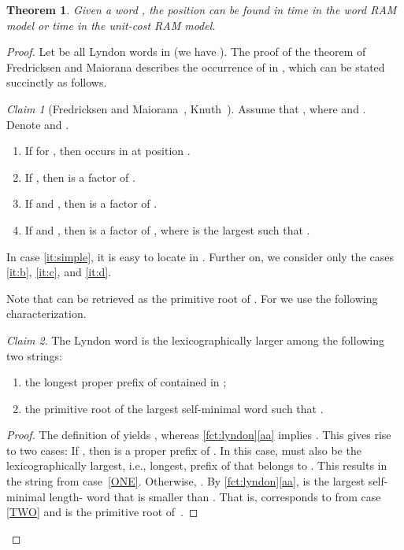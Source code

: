 \documentclass{article}
\newtheorem{theorem}{Theorem}
\theoremstyle{definition}
\theoremstyle{remark}
\newtheorem*{claim}{Claim}
\begin{document}
\begin{theorem}\label{thm:decoding}
  Given a word , the position  can be found in  time in the word RAM model or  time in the unit-cost RAM model.
\end{theorem}
\begin{proof}
  Let  be all Lyndon words in 
  (we have ).
  The proof of the theorem of Fredricksen and Maiorana \cite{fredricksen1978necklaces,Knuth}
  describes the occurrence of  in , which can be stated succinctly as follows.
  \begin{claim}[Fredricksen and Maiorana~\cite{fredricksen1978necklaces}, Knuth~\cite{Knuth}]
       Assume that , where  and .
     Denote  and .  
  \begin{enumerate}[label={(\alph*)}] 
    \item\label{it:simple} If  for , then  occurs in  at position .
    \item\label{it:b} If , then  is a factor of .
    \item\label{it:c} If  and , then  is a factor of .
    \item\label{it:d} If  and , then  is a factor of ,
    where  is the largest  such that .
  \end{enumerate}
  \end{claim}
  In case \ref{it:simple}, it is easy to locate  in .
  Further on, we consider only the cases \ref{it:b}, \ref{it:c}, and \ref{it:d}.

  Note that  can be retrieved as the primitive root of . For  we use the following characterization.
    \begin{claim}
      The Lyndon word  is the lexicographically larger among the following two strings:
    \begin{enumerate}[label={(\arabic*)}]
    \item\label{ONE} the longest proper prefix of  contained in ;
    \item\label{TWO} the primitive root of the largest self-minimal word  such that .
    \end{enumerate}
    \end{claim}
    \begin{proof}
  The definition of  yields , whereas
    \cref{fct:lyndon}\ref{aa} implies .
    This gives rise to two cases:
    If , then  is a proper prefix of .
    In this case,  must also be the lexicographically largest, i.e., longest, prefix of  that belongs to .
    This results in the string from case~\ref{ONE}.
    Otherwise, .
    By \cref{fct:lyndon}\ref{aa},  is the largest self-minimal length- word that is smaller than .
    That is,  corresponds to  from case \ref{TWO} and  is the primitive root of~.
    \end{proof}


\end{proof}
\end{document}
